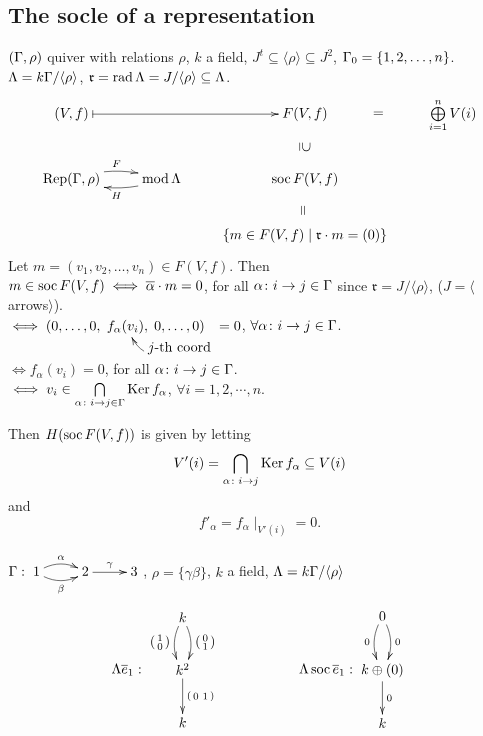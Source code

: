 \subsection{The socle of a representation}
$(\Gamma, \rho)$ quiver with relations $\rho$, $k$ a field, $J^t \subseteq
\langle \rho \rangle \subseteq J^2$, $\Gamma_0 = \{ 1, 2, \ldots, n
\}$. $\Lambda = k\Gamma/\langle \rho \rangle$, $\mathfrak{r} = \operatorname{rad}\nolimits\Lambda
= J/\langle \rho \rangle \subseteq \Lambda$. 
\[\xymatrix{
(V, f) \ar@{|->}[rr] && F(V,f) \ar@{}[d]|-*[@]{\supseteq} \ar@{}[r]|-*[@]{=} & \bigoplus\limits_{i=1}^n V(i)\\
\Rep(\G, \rho) \ar@/^0.5pc/[r]^F & \ar@/^0.5pc/[l]^H \mod\Lambda & \soc F(V,f) \ar@{}[d]|-*[@]{=}\\
               &             & \{ m \in F(V,f) \mid \mathfrak{r}\cdot m = (0) \}
}\]
Let $m= (v_1, v_2, \ldots, v_n) \in F(V, f)$. Then\\
$ m \in \operatorname{soc} F(V, f) \iff \overline{\alpha} \cdot m = 0$, for all
$\alpha \colon i \to j \in \Gamma $ since $\mathfrak{r} = J/\langle \rho
\rangle$, ($J = \langle$arrows$\rangle$).\\ 
$\iff (0, \ldots,0, 
\xymatrix@R-2pc@C-2.5pc{
f_\alpha(v_i), & 0, \ldots, 0)\\ 
& j\text{-th coord} \ar@/^1pc/[ul]}=0$, $\forall \alpha\colon i \to j \in \Gamma$.\\
$\iff f_\alpha(v_i) = 0$, for all $\alpha \colon i \to j \in \Gamma$.\\
$\iff v_i \in \bigcap\limits_{\alpha \colon i \to j \in \Gamma} \operatorname{Ker}\nolimits
f_\alpha$, $\forall i = 1, 2, \cdots, n$. 

Then $H(\operatorname{soc} F(V, f))$ is given by letting 
\[V'(i) = \bigcap\limits_{\alpha \colon i \to j} \operatorname{Ker}\nolimits f_\alpha
  \subseteq V(i)\] 
and 
\[f'_\alpha = f_\alpha\mid_{V'(i)} = 0.\]

\begin{exam}
\[\]
$\G: \xymatrix{
1 \ar@/^0.5pc/[r]^\alpha \ar@/_0.5pc/[r]_\beta & 2 \ar[r]^\gamma & 3
}$, $\rho = \{ \gamma\beta \}$, $k$ a field, $\Lambda = k\Gamma/\langle \rho \rangle$
\[
\Lambda \overline{e}_1: \vcenter{\xymatrix{
k \ar@/_0.5pc/[d]_-{\left(\begin{smallmatrix} 1\\0 \end{smallmatrix}\right)} \ar@/^0.5pc/[d]^-{\left(\begin{smallmatrix} 0\\1 \end{smallmatrix}\right)}\\
k^2 \ar[d]^-{\left(\begin{smallmatrix} 0 & 1 \end{smallmatrix}\right)}\\
k
}}
\hspace{2cm}
\Lambda \soc\overline{e}_1: \vcenter{\xymatrix{
0 \ar@/_0.5pc/[d]_-{0} \ar@/^0.5pc/[d]^-{0}\\
k \oplus (0) \ar[d]^-{0}\\
k
}}
\]
\end{exam}